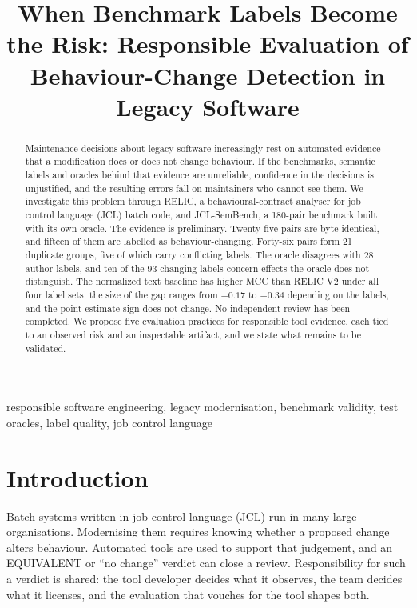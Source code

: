 \documentclass[conference]{IEEEtran}
\begin{document}
\title{When Benchmark Labels Become the Risk: Responsible Evaluation of Behaviour-Change Detection in Legacy Software}

\author{
}

\maketitle

\begin{abstract}
Maintenance decisions about legacy software increasingly rest on automated evidence that a modification does or does not change behaviour. If the benchmarks, semantic labels and oracles behind that evidence are unreliable, confidence in the decisions is unjustified, and the resulting errors fall on maintainers who cannot see them. We investigate this problem through RELIC, a behavioural-contract analyser for job control language (JCL) batch code, and JCL-SemBench, a 180-pair benchmark built with its own oracle. The evidence is preliminary. Twenty-five pairs are byte-identical, and fifteen of them are labelled as behaviour-changing. Forty-six pairs form 21 duplicate groups, five of which carry conflicting labels. The oracle disagrees with 28 author labels, and ten of the 93 changing labels concern effects the oracle does not distinguish. The normalized text baseline has higher MCC than RELIC V2 under all four label sets; the size of the gap ranges from $-0.17$ to $-0.34$ depending on the labels, and the point-estimate sign does not change. No independent review has been completed. We propose five evaluation practices for responsible tool evidence, each tied to an observed risk and an inspectable artifact, and we state what remains to be validated.
\end{abstract}

\begin{IEEEkeywords}
responsible software engineering, legacy modernisation, benchmark validity, test oracles, label quality, job control language
\end{IEEEkeywords}

\section{Introduction}
Batch systems written in job control language (JCL) run in many large organisations. Modernising them requires knowing whether a proposed change alters behaviour. Automated tools are used to support that judgement, and an EQUIVALENT or ``no change'' verdict can close a review. Responsibility for such a verdict is shared: the tool developer decides what it observes, the team decides what it licenses, and the evaluation that vouches for the tool shapes both.
\end{document}
